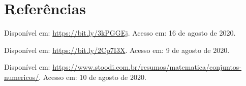 \documentclass[10pt]{article}
\begin{document}
\vfill
\section*{Referências}
\noindent Disponível em: \url{https://bit.ly/3kPGGEj}. Acesso em: 16 de agosto de 2020.

\noindent Disponível em: 
\url{https://bit.ly/2Cp7I3X}. Acesso em: 9 de agosto de 2020.

\noindent Disponível em: 
\url{https://www.stoodi.com.br/resumos/matematica/conjuntos-numericos/}. Acesso em: 10 de agosto de 2020.
\end{document}
